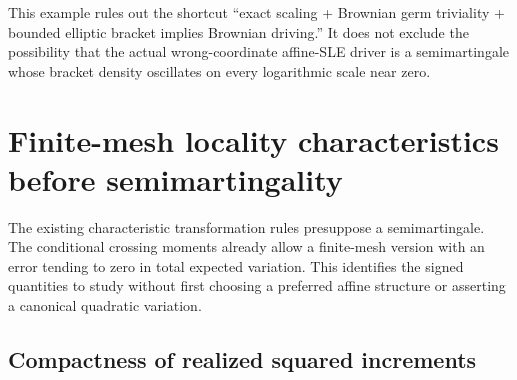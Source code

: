 \documentclass[11pt]{article}
\theoremstyle{definition}\newtheorem{definition}[theorem]{Definition}
\theoremstyle{remark}\newtheorem{remark}[theorem]{Remark}
\begin{document}
This example rules out the shortcut ``exact scaling + Brownian
germ triviality + bounded elliptic bracket implies Brownian
driving.'' It does not exclude the possibility that the actual
wrong-coordinate affine-SLE driver is a semimartingale whose bracket
density oscillates on every logarithmic scale near zero.

\section{Finite-mesh locality characteristics before semimartingality}
\label{sec:finite-mesh-locality}

The existing characteristic transformation rules presuppose a
semimartingale. The conditional crossing moments already allow a
finite-mesh version with an error tending to zero in total expected
variation. This identifies the signed quantities to study without
first choosing a preferred affine structure or asserting a canonical
quadratic variation.

\subsection{Compactness of realized squared increments}
\end{document}
